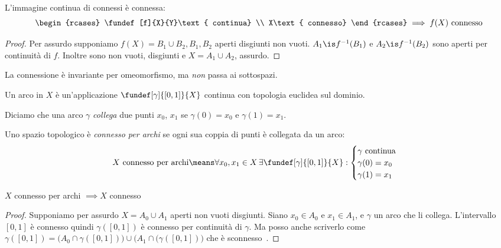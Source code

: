 
\begin{teo}
	L'immagine continua di connessi è connessa:
	\[\begin{rcases}
		\fundef[f]{X}{Y}\text{ continua} \\
		X\text{ connesso}
	\end{rcases}\implies
	f(X)\text{ connesso}\] 
\end{teo}

\begin{proof}
	Per assurdo supponiamo $f(X) = B_1 \cup B_2, B_1,B_2$ aperti disgiunti non vuoti.
	$A_1\is f^{-1}(B_1)$ e $A_2\is f^{-1}(B_2)$ sono aperti per continuità di $f$.
	Inoltre sono non vuoti, disgiunti e $X=A_1\cup A_2$, assurdo.
\end{proof}

\begin{oss}
	La connessione è invariante per omeomorfismo, ma \emph{non} passa ai sottospazi. 
\end{oss}

\begin{defn}[Arco]
	Un arco in $X$ è un'applicazione $\fundef[\gamma]{[0,1]}{X}$ continua con topologia euclidea sul dominio.
\end{defn}

Diciamo che una arco $\gamma$ \emph{collega} due punti $x_0$, $x_1$ se $\gamma(0)=x_0$ e $\gamma(1)=x_1$.

\begin{defn}
	Uno spazio topologico è \emph{connesso per archi} se ogni sua coppia di punti è collegata da un arco:
	\[\text{$X$ connesso per archi}\means
	\forall x_0, x_1 \in X \,\exists \fundef[\gamma]{[0,1]}{X}:
	\begin{cases}
		\text{$\gamma$ continua} \\
		\gamma(0)=x_0 \\
		\gamma(1)=x_1
	\end{cases}\]
\end{defn}

\begin{prop}
	$X$ connesso per archi $\implies X$ connesso
\end{prop}

\begin{proof}
	Supponiamo per assurdo $X=A_0\cup A_1$ aperti non vuoti disgiunti.
	Siano $x_0\in A_0$ e $x_1\in A_1$,
	e $\gamma$ un arco che li collega.
	L'intervallo $[0,1]$ è connesso quindi $\gamma([0,1])$ è connesso per continuità di $\gamma$.
	Ma posso anche scriverlo come
	$\gamma([0,1])=\big(A_0\cap \gamma([0,1])\big) \cup \big(A_1\cap(\gamma([0,1])\big)$
	che è sconnesso~\absurd.
\end{proof}

